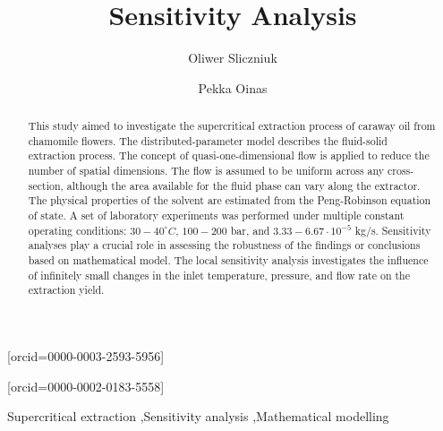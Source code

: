 \documentclass[a4paper,fleqn]{cas-dc}
\begin{document}
 

\title[mode=title]{Sensitivity Analysis}                      


\author[1]{Oliwer Sliczniuk}[orcid=0000-0003-2593-5956]
\cormark[1]

\author[1]{Pekka Oinas}[orcid=0000-0002-0183-5558]


\address[1]{Aalto University, School of Chemical Engineering, Espoo, 02150, Finland}


\begin{abstract}
This study aimed to investigate the supercritical extraction process of caraway oil from chamomile flowers. The distributed-parameter model describes the fluid-solid extraction process. The concept of quasi-one-dimensional flow is applied to reduce the number of spatial dimensions. The flow is assumed to be uniform across any cross-section, although the area available for the fluid phase can vary along the extractor. The physical properties of the solvent are estimated from the Peng-Robinson equation of state. A set of laboratory experiments was performed under multiple constant operating conditions: $30 - 40^\circ C$, $100 - 200$ bar, and $3.33-6.67 \cdot 10^{-5}$ kg/s. Sensitivity analyses play a crucial role in assessing the robustness of the findings or conclusions based on mathematical model. The local sensitivity analysis investigates the influence of infinitely small changes in the inlet temperature, pressure, and flow rate on the extraction yield.

\end{abstract}

\begin{keywords}
Supercritical extraction \sep Sensitivity analysis \sep Mathematical modelling
\end{keywords}

\maketitle
\end{document}
